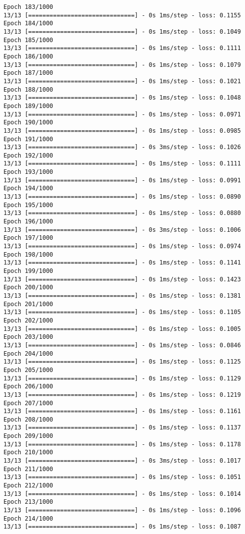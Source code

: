 \documentclass[11pt]{article}
\begin{document}
\begin{Verbatim}[commandchars=\\\{\}]
Epoch 183/1000
13/13 [==============================] - 0s 1ms/step - loss: 0.1155
Epoch 184/1000
13/13 [==============================] - 0s 1ms/step - loss: 0.1049
Epoch 185/1000
13/13 [==============================] - 0s 1ms/step - loss: 0.1111
Epoch 186/1000
13/13 [==============================] - 0s 1ms/step - loss: 0.1079
Epoch 187/1000
13/13 [==============================] - 0s 1ms/step - loss: 0.1021
Epoch 188/1000
13/13 [==============================] - 0s 1ms/step - loss: 0.1048
Epoch 189/1000
13/13 [==============================] - 0s 1ms/step - loss: 0.0971
Epoch 190/1000
13/13 [==============================] - 0s 1ms/step - loss: 0.0985
Epoch 191/1000
13/13 [==============================] - 0s 3ms/step - loss: 0.1026
Epoch 192/1000
13/13 [==============================] - 0s 1ms/step - loss: 0.1111
Epoch 193/1000
13/13 [==============================] - 0s 1ms/step - loss: 0.0991
Epoch 194/1000
13/13 [==============================] - 0s 1ms/step - loss: 0.0890
Epoch 195/1000
13/13 [==============================] - 0s 1ms/step - loss: 0.0880
Epoch 196/1000
13/13 [==============================] - 0s 3ms/step - loss: 0.1006
Epoch 197/1000
13/13 [==============================] - 0s 1ms/step - loss: 0.0974
Epoch 198/1000
13/13 [==============================] - 0s 1ms/step - loss: 0.1141
Epoch 199/1000
13/13 [==============================] - 0s 1ms/step - loss: 0.1423
Epoch 200/1000
13/13 [==============================] - 0s 1ms/step - loss: 0.1381
Epoch 201/1000
13/13 [==============================] - 0s 1ms/step - loss: 0.1105
Epoch 202/1000
13/13 [==============================] - 0s 1ms/step - loss: 0.1005
Epoch 203/1000
13/13 [==============================] - 0s 1ms/step - loss: 0.0846
Epoch 204/1000
13/13 [==============================] - 0s 1ms/step - loss: 0.1125
Epoch 205/1000
13/13 [==============================] - 0s 1ms/step - loss: 0.1129
Epoch 206/1000
13/13 [==============================] - 0s 1ms/step - loss: 0.1219
Epoch 207/1000
13/13 [==============================] - 0s 1ms/step - loss: 0.1161
Epoch 208/1000
13/13 [==============================] - 0s 1ms/step - loss: 0.1137
Epoch 209/1000
13/13 [==============================] - 0s 1ms/step - loss: 0.1178
Epoch 210/1000
13/13 [==============================] - 0s 3ms/step - loss: 0.1017
Epoch 211/1000
13/13 [==============================] - 0s 1ms/step - loss: 0.1051
Epoch 212/1000
13/13 [==============================] - 0s 1ms/step - loss: 0.1014
Epoch 213/1000
13/13 [==============================] - 0s 1ms/step - loss: 0.1096
Epoch 214/1000
13/13 [==============================] - 0s 1ms/step - loss: 0.1087

\end{Verbatim}
\end{document}
